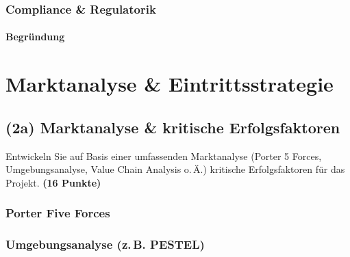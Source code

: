 \documentclass[
%
ngerman %
%
numeric %
]{wbh-assignment}
\begin{document}
\subsubsection{Compliance \& Regulatorik}

\paragraph{Begründung}


\section{Marktanalyse \& Eintrittsstrategie}
\label{sec:marktanalyse}

\subsection{(2a) Marktanalyse \& kritische Erfolgsfaktoren}
\begin{aufgabenstellung}
Entwickeln Sie auf Basis einer umfassenden Marktanalyse (Porter 5 Forces, Umgebungsanalyse, Value Chain Analysis o.\,Ä.) kritische Erfolgsfaktoren für das Projekt. \textbf{(16 Punkte)}
\end{aufgabenstellung}

\vspace*{5mm}

\subsubsection{Porter Five Forces}

\subsubsection{Umgebungsanalyse (z.\,B. PESTEL)}
\end{document}
